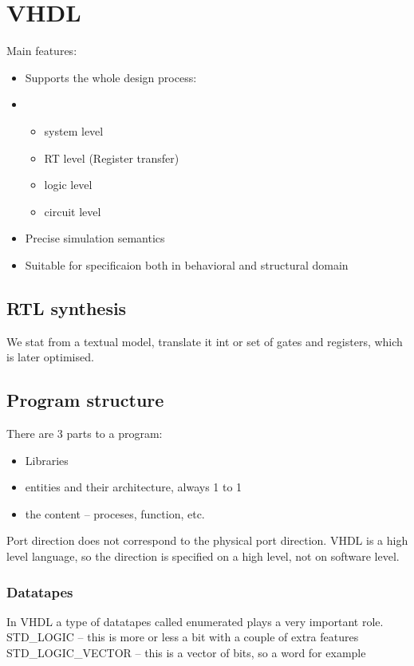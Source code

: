 

\chapter{VHDL}
Main features:
\begin{itemize}
    \item Supports the whole design process:
    \item \begin{itemize}
            \item system level
            \item RT level (Register transfer)
            \item logic level
                \item circuit level
        \end{itemize}
    \item Precise simulation semantics
    \item Suitable for specificaion both in behavioral and structural domain
\end{itemize}

\section{RTL synthesis}
We stat from a textual model, translate it int or set of gates and registers, which is later optimised.

\section{Program structure}
There are 3 parts to a program:
\begin{itemize}
    \item Libraries
    \item entities and their architecture, always 1 to 1
    \item the content -- proceses, function, etc.
\end{itemize}

\nt
{
    Port direction does not correspond to the physical port direction. VHDL is a high level language, so the direction
    is specified on a high level, not on software level.
}

\subsection{Datatapes}
In VHDL a type of datatapes called enumerated plays a very important role.
\nt
{
    STD_LOGIC -- this is more or less a bit with a couple of extra features\\
    STD_LOGIC_VECTOR -- this is a vector of  bits, so a word for example
}

